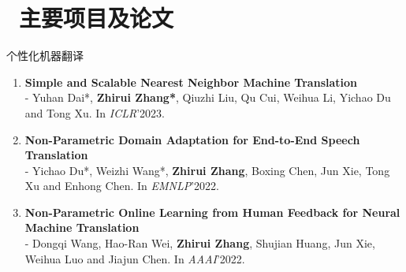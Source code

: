 \documentclass{resume}
\begin{document}
\section{\faFilesO\ 主要项目及论文}

个性化机器翻译
\begin{enumerate}

\item \normalsize \textbf{Simple and Scalable Nearest Neighbor Machine Translation}\\
\small - Yuhan Dai*, \textbf{Zhirui Zhang*}, Qiuzhi Liu, Qu Cui, Weihua Li, Yichao Du and Tong Xu. In \textit{ICLR}'2023.

\item \normalsize \textbf{Non-Parametric Domain Adaptation for End-to-End Speech Translation}\\
\small - Yichao Du*, Weizhi Wang*, \textbf{Zhirui Zhang}, Boxing Chen, Jun Xie, Tong Xu and Enhong Chen. In \textit{EMNLP}'2022.

\item \normalsize \textbf{Non-Parametric Online Learning from Human Feedback for Neural Machine Translation}\\
\small - Dongqi Wang, Hao-Ran Wei, \textbf{Zhirui Zhang}, Shujian Huang, Jun Xie, Weihua Luo and Jiajun Chen. In \textit{AAAI}'2022.





\end{enumerate}
\end{document}
